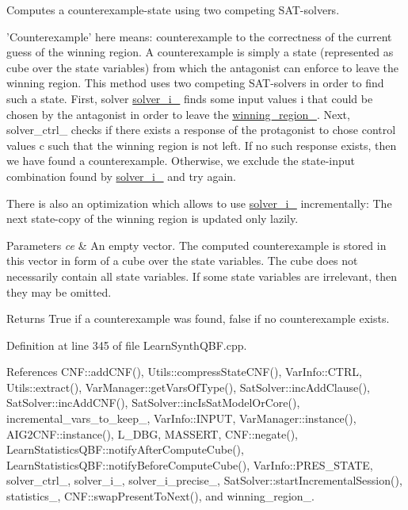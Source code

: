 Computes a counterexample-\/state using two competing S\-A\-T-\/solvers. 

'Counterexample' here means\-: counterexample to the correctness of the current guess of the winning region. A counterexample is simply a state (represented as cube over the state variables) from which the antagonist can enforce to leave the winning region. This method uses two competing S\-A\-T-\/solvers in order to find such a state. First, solver \hyperlink{classLearnSynthQBF_ada2e8c87c0ca0d83c484d6181ea5a788}{solver\-\_\-i\-\_\-} finds some input values i that could be chosen by the antagonist in order to leave the \hyperlink{classLearnSynthQBF_a9c6b41f7df5f4ed4bfc5930136fc1152}{winning\-\_\-region\-\_\-}. Next, solver\-\_\-ctrl\-\_\- checks if there exists a response of the protagonist to chose control values c such that the winning region is not left. If no such response exists, then we have found a counterexample. Otherwise, we exclude the state-\/input combination found by \hyperlink{classLearnSynthQBF_ada2e8c87c0ca0d83c484d6181ea5a788}{solver\-\_\-i\-\_\-} and try again.

There is also an optimization which allows to use \hyperlink{classLearnSynthQBF_ada2e8c87c0ca0d83c484d6181ea5a788}{solver\-\_\-i\-\_\-} incrementally\-: The next state-\/copy of the winning region is updated only lazily.


\begin{DoxyParams}{Parameters}
{\em ce} & An empty vector. The computed counterexample is stored in this vector in form of a cube over the state variables. The cube does not necessarily contain all state variables. If some state variables are irrelevant, then they may be omitted. \\
\hline
\end{DoxyParams}
\begin{DoxyReturn}{Returns}
True if a counterexample was found, false if no counterexample exists. 
\end{DoxyReturn}


Definition at line 345 of file Learn\-Synth\-Q\-B\-F.\-cpp.



References C\-N\-F\-::add\-C\-N\-F(), Utils\-::compress\-State\-C\-N\-F(), Var\-Info\-::\-C\-T\-R\-L, Utils\-::extract(), Var\-Manager\-::get\-Vars\-Of\-Type(), Sat\-Solver\-::inc\-Add\-Clause(), Sat\-Solver\-::inc\-Add\-C\-N\-F(), Sat\-Solver\-::inc\-Is\-Sat\-Model\-Or\-Core(), incremental\-\_\-vars\-\_\-to\-\_\-keep\-\_\-, Var\-Info\-::\-I\-N\-P\-U\-T, Var\-Manager\-::instance(), A\-I\-G2\-C\-N\-F\-::instance(), L\-\_\-\-D\-B\-G, M\-A\-S\-S\-E\-R\-T, C\-N\-F\-::negate(), Learn\-Statistics\-Q\-B\-F\-::notify\-After\-Compute\-Cube(), Learn\-Statistics\-Q\-B\-F\-::notify\-Before\-Compute\-Cube(), Var\-Info\-::\-P\-R\-E\-S\-\_\-\-S\-T\-A\-T\-E, solver\-\_\-ctrl\-\_\-, solver\-\_\-i\-\_\-, solver\-\_\-i\-\_\-precise\-\_\-, Sat\-Solver\-::start\-Incremental\-Session(), statistics\-\_\-, C\-N\-F\-::swap\-Present\-To\-Next(), and winning\-\_\-region\-\_\-.



